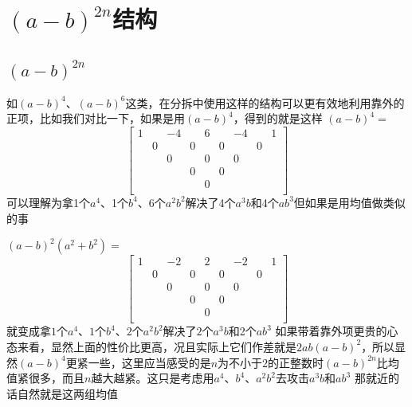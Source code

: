 \documentclass[UTF8]{ctexart}
\begin{document}
\section{$ (a-b)^{2n}$结构}
\subsection{$ (a-b)^{2n}$}
如$ (a-b)^{4} $、$ (a-b)^{6} $这类，在分拆中使用这样的结构可以更有效地利用靠外的正项，比如我们对比一下，如果是用$ (a-b)^{4} $，得到的就是这样
$ (a-b)^{4}= $
\renewcommand*{\arraystretch}{1.732}\[\left[\begin{matrix}
	1& &-4& &6& &-4& &1\\
	&0& &0& &0& &0&\\
	& &0& &0& &0& &\\
	& & &0& &0& & &\\
	& & & &0& & & &\\
\end{matrix}\right]\]
可以理解为拿1个$ a^{4} $、1个$ b^{4} $、6个$ a^{2}b^{2} $解决了4个$ a^{3}b $和4个$ ab^{3} $但如果是用均值做类似的事

$ (a-b)^{2}(a^{2}+b^{2})= $
\renewcommand*{\arraystretch}{1.732}\[\left[\begin{matrix}
	1& &-2& &2& &-2& &1\\
	&0& &0& &0& &0&\\
	& &0& &0& &0& &\\
	& & &0& &0& & &\\
	& & & &0& & & &\\
\end{matrix}\right]\]
就变成拿$ 1 $个$ a^{4} $、$ 1 $个$ b^{4} $、$ 2 $个$ a^{2}b^{2} $解决了$ 2 $个$ a^{3}b $和2个$ ab^{3} $
如果带着靠外项更贵的心态来看，显然上面的性价比更高，况且实际上它们作差就是$ 2ab(a-b)^{2} $，所以显然$ (a-b)^{4} $更紧一些，这里应当感受的是$ n $为不小于$ 2 $的正整数时$ (a-b)^{2n} $比均值紧很多，而且$ n $越大越紧。这只是考虑用$ a^{4} $、$ b^{4} $、$ a^{2}b^{2} $去攻击$ a^{3}b $和$ ab^{3} $
那就近的话自然就是这两组均值\\
\end{document}
